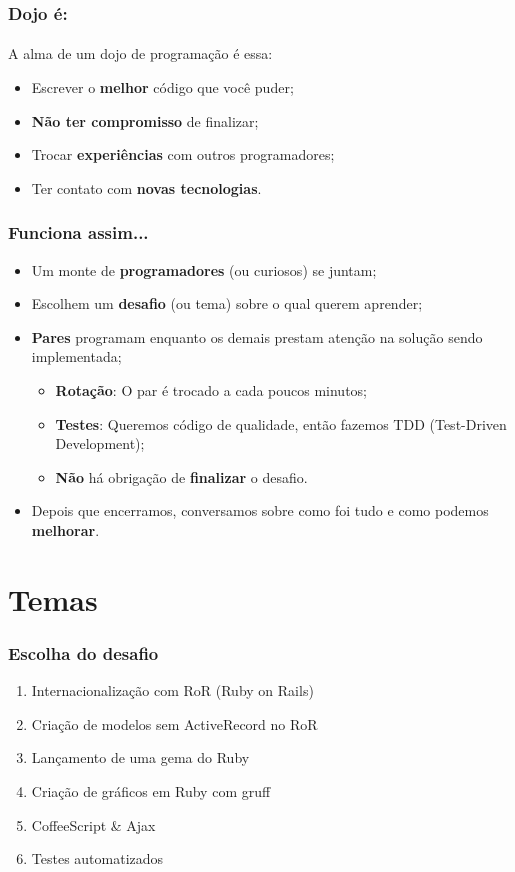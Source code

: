 \documentclass{beamer}
\begin{document}
\begin{frame}
  \frametitle{Dojo é:}
  \framesubtitle{}
  A alma de um dojo de programação é essa:
  \begin{itemize}
    \item Escrever o \textbf{melhor} código que você puder;
    \item \textbf{Não ter compromisso} de finalizar;
    \item Trocar \textbf{experiências} com outros programadores;
    \item Ter contato com \textbf{novas tecnologias}.
  \end{itemize}
\end{frame}

\begin{frame}
  \frametitle{Funciona assim...}

  \begin{itemize}
    \item Um monte de \textbf{programadores} (ou curiosos) se juntam;
    \item Escolhem um \textbf{desafio} (ou tema) sobre o qual querem aprender;
    \item \textbf{Pares} programam enquanto os demais prestam atenção na solução sendo implementada;
      \begin{itemize}
        \item \textbf{Rotação}: O par é trocado a cada poucos minutos;
        \item \textbf{Testes}: Queremos código de qualidade, então fazemos TDD (Test-Driven Development);
        \item \textbf{Não} há obrigação de \textbf{finalizar} o desafio.
      \end{itemize}
    \item Depois que encerramos, conversamos sobre como foi tudo e como podemos \textbf{melhorar}.
  \end{itemize}
\end{frame}

\section{Temas}
\begin{frame}
  \frametitle{Escolha do desafio}

  \begin{enumerate}
    \item Internacionalização com RoR (Ruby on Rails)
    \item Criação de modelos sem ActiveRecord no RoR
    \item Lançamento de uma gema do Ruby
    \item Criação de gráficos em Ruby com gruff
    \item CoffeeScript \& Ajax
    \item Testes automatizados
  \end{enumerate}
\end{frame}
\end{document}
